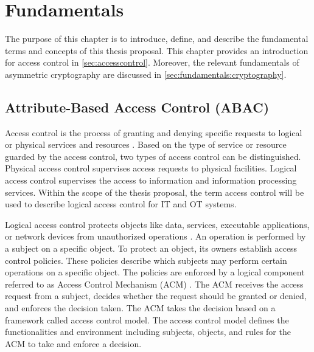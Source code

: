 \chapter{Fundamentals}
\label{ch:fundamentals}
The purpose of this chapter is to introduce, define, and describe the fundamental terms and concepts of this thesis proposal.
This chapter provides an introduction for access control in \autoref{sec:accesscontrol}.
Moreover, the relevant fundamentals of asymmetric cryptography are discussed in \autoref{sec:fundamentals:cryptography}.

\section{Attribute-Based Access Control (ABAC)}
\label{sec:accesscontrol}
Access control is the process of granting and denying specific requests to logical or physical services and resources \cite{NIST2022}.
Based on the type of service or resource guarded by the access control, two types of access control can be distinguished.
Physical access control supervises access requests to physical facilities.
Logical access control supervises the access to information and information processing services.
Within the scope of the thesis proposal, the term access control will be used to describe logical access control for IT and OT systems.

Logical access control protects objects like data, services, executable applications, or network devices from unauthorized operations \cite{Hu2014}.
An operation is performed by a subject on a specific object.
To protect an object, its owners establish access control policies.
These policies describe which subjects may perform certain operations on a specific object.
The policies are enforced by a logical component referred to as Access Control Mechanism (ACM) \cite{Hu2014}.
The ACM receives the access request from a subject, decides whether the request should be granted or denied, and enforces the decision taken.
The ACM takes the decision based on a framework called access control model.
The access control model defines the functionalities and environment including subjects, objects, and rules for the ACM to take and enforce a decision.

